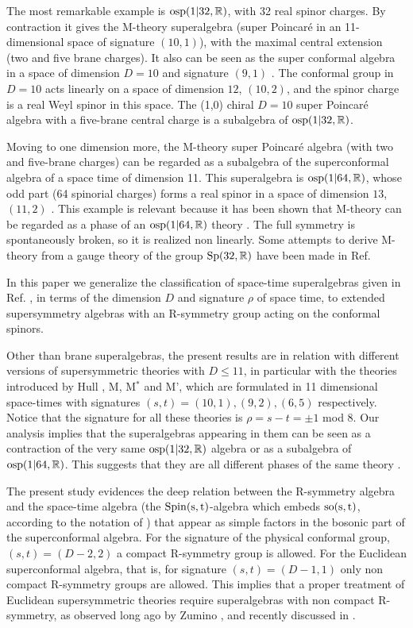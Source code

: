 \documentclass[a4paper,12pt]{article}
\begin{document}
 The most remarkable example is $\rm{osp}(1| 32,\mathbb{R})$,
  with  32 real spinor charges. By contraction \cite{df} it gives the
M-theory superalgebra (super Poincar\'e in an 11-dimensional space
of signature $(10,1)$), with the maximal central extension (two
and five brane charges). It also can be seen as the super
conformal algebra in a space of dimension  $D=10$ and signature
$(9,1)$ \cite{to,gu}. The conformal group in $D=10$ acts linearly
on a space of dimension $12$, $(10,2)$, and the spinor charge is a
real Weyl spinor in this space. The (1,0) chiral $D=10$ super
Poincar\'e algebra with a five-brane central charge is a
subalgebra of $\rm{osp}(1| 32,\mathbb{R})$.

Moving to one dimension more, the M-theory super Poincar\'e
algebra (with two and five-brane charges) can be regarded as a
subalgebra of the superconformal algebra  of a space time of
dimension 11. This superalgebra is $\rm{osp}(1| 64,\mathbb{R})$, whose odd
part (64 spinorial charges) forms a real spinor in a space of
dimension $13$, $(11,2)$ \cite{vv, dflv}. This example is relevant
because it has been shown that M-theory can be regarded as a phase
 of an $\rm{osp}(1| 64,\mathbb{R})$
theory \cite{we}. The full symmetry is spontaneously broken, so it
is realized non linearly. Some attempts to derive M-theory from a
gauge theory of the group $\rm{Sp}(32,\mathbb{R})$ have been made in Ref.
\cite{ho}

In this paper we generalize the classification of space-time
superalgebras given in  Ref. \cite{dflv}, in terms of the
dimension $D$ and signature $\rho$ of space time, to extended
supersymmetry algebras with an R-symmetry group acting on the
conformal spinors.

Other than brane superalgebras, the present results are in
relation with different versions of supersymmetric theories with
$D\leq 11$, in particular with the theories introduced by Hull
\cite{hu}, M, M$^*$ and M', which are formulated in 11 dimensional
space-times with signatures $(s,t)=(10,1), (9,2),(6,5)$
respectively. Notice that the signature for all these theories is
$\rho=s-t=\pm1$ mod 8. Our analysis implies that the superalgebras
appearing in them  can be seen  as a contraction of the very same
$\rm{osp}(1| 32,\mathbb{R})$ algebra or as a subalgebra of $\rm{osp}(1|
64,\mathbb{R})$. This suggests that they are all different phases of the
same theory \cite{hu, fe}.

The present study evidences  the deep relation between the
R-symmetry algebra and the space-time algebra (the
$\rm{Spin}(s,t)$-algebra which embeds $\rm{so}(s,t)$, according to
the notation of \cite{dflv} ) that appear as simple factors in the
bosonic part of the superconformal algebra. For the signature of
the physical conformal group, $(s,t)=(D-2,2)$ a compact R-symmetry
group is allowed. For the Euclidean superconformal algebra, that
is, for signature $(s,t)=(D-1,1)$ only non compact R-symmetry
groups are allowed. This implies that a proper treatment of
Euclidean supersymmetric theories require superalgebras with non
compact R-symmetry, as observed long ago by Zumino \cite{zu}, and
recently discussed in \cite{si,mc,bvv}.
\end{document}
